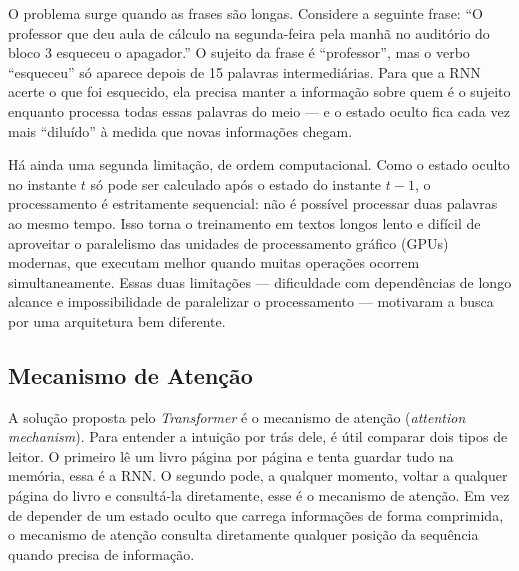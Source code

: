 O problema surge quando as frases são longas. Considere a seguinte frase: ``O professor
que deu aula de cálculo na segunda-feira pela manhã no auditório do bloco 3 esqueceu o
apagador.'' O sujeito da frase é ``professor'', mas o verbo ``esqueceu'' só aparece
depois de 15 palavras intermediárias. Para que a RNN acerte o que foi esquecido, ela
precisa manter a informação sobre quem é o sujeito enquanto processa todas essas
palavras do meio --- e o estado oculto fica cada vez mais ``diluído'' à medida que novas
informações chegam. 

Há ainda uma segunda limitação, de ordem computacional. Como o estado oculto no instante
$t$ só pode ser calculado após o estado do instante $t-1$, o processamento é
estritamente sequencial: não é possível processar duas palavras ao mesmo tempo.
Isso torna o treinamento em textos longos lento e difícil de aproveitar o paralelismo das
unidades de processamento gráfico (GPUs) modernas, que executam melhor quando muitas
operações ocorrem simultaneamente. Essas duas limitações --- dificuldade com dependências
de longo alcance e impossibilidade de paralelizar o processamento --- motivaram a busca
por uma arquitetura bem diferente.


\subsection{Mecanismo de Atenção}\label{subsec:atencao}

A solução proposta pelo \textit{Transformer} é o mecanismo de atenção (\textit{attention
mechanism}). Para entender a intuição por trás dele, é útil comparar dois tipos de
leitor. O primeiro lê um livro página por página e tenta guardar tudo na memória,
essa é a RNN. O segundo pode, a qualquer momento, voltar a qualquer página do livro e
consultá-la diretamente, esse é o mecanismo de atenção. Em vez de depender de um
estado oculto que carrega informações de forma comprimida, o mecanismo de atenção
consulta diretamente qualquer posição da sequência quando precisa de informação.

